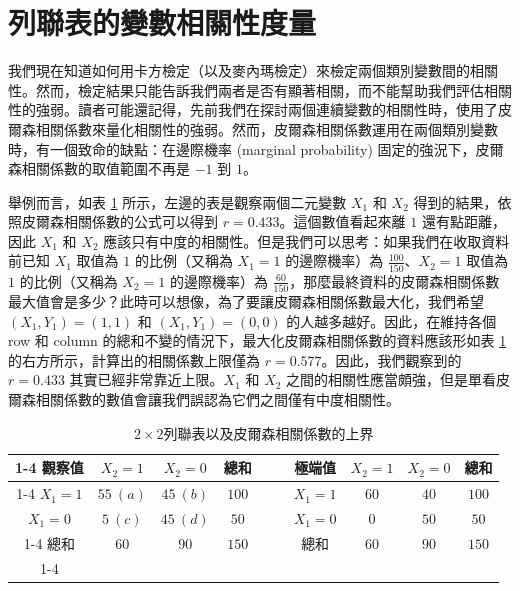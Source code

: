 \section{列聯表的變數相關性度量}
    我們現在知道如何用卡方檢定（以及麥內瑪檢定）來檢定兩個類別變數間的相關性。然而，檢定結果只能告訴我們兩者是否有顯著相關，而不能幫助我們評估相關性的強弱。讀者可能還記得，先前我們在探討兩個連續變數的相關性時，使用了皮爾森相關係數來量化相關性的強弱。然而，皮爾森相關係數運用在兩個類別變數時，有一個致命的缺點：在邊際機率 (marginal probability) 固定的強況下，皮爾森相關係數的取值範圍不再是 $-1$ 到 $1$。

    \medskip
    
    舉例而言，如表 \ref{tab:odds_ratio} 所示，左邊的表是觀察兩個二元變數 $X_1$ 和 $X_2$ 得到的結果，依照皮爾森相關係數的公式可以得到 $r=0.433$。這個數值看起來離 $1$ 還有點距離，因此 $X_1$ 和 $X_2$ 應該只有中度的相關性。但是我們可以思考：如果我們在收取資料前已知 $X_1$ 取值為 $1$ 的比例（又稱為 $X_1=1$ 的邊際機率）為 $\frac{100}{150}$、$X_2 = 1$ 取值為 $1$ 的比例（又稱為 $X_2=1$ 的邊際機率）為 $\frac{60}{150}$，那麼最終資料的皮爾森相關係數最大值會是多少？此時可以想像，為了要讓皮爾森相關係數最大化，我們希望 $(X_1, Y_1) = (1,1)$ 和 $(X_1, Y_1) = (0,0)$ 的人越多越好。因此，在維持各個 row 和 column 的總和不變的情況下，最大化皮爾森相關係數的資料應該形如表 \ref{tab:odds_ratio} 的右方所示，計算出的相關係數上限僅為 $r=0.577$。因此，我們觀察到的 $r=0.433$ 其實已經非常靠近上限。$X_1$ 和 $X_2$ 之間的相關性應當頗強，但是單看皮爾森相關係數的數值會讓我們誤認為它們之間僅有中度相關性。

    \bigskip

    \begin{table}[htbp]
        \begin{center}
            \begin{tabular}{c|cc|cccc|cc|c}
                \cline{1-4}\cline{7-10}
                觀察值 & $X_2=1$ & $X_2=0$ & 總和 &&& 極端值 & $X_2=1$ & $X_2=0$ & 總和\\
                \cline{1-4}\cline{7-10}
                $X_1=1$ & $55~(a)$ & $45~(b)$ & $100$ &&& $X_1=1$ & $60$ & $40$ & $100$\\
                $X_1=0$ & $5~(c)$ & $45~(d)$ & $50$ &&& $X_1=0$ & $0$ & $50$ & $50$\\
                \cline{1-4}\cline{7-10}
                總和 & $60$ & $90$ & $150$ &&& 總和 & $60$ & $90$ & $150$\\
                \cline{1-4}\cline{7-10}
            \end{tabular}
            \caption{$2 \times 2$列聯表以及皮爾森相關係數的上界\label{tab:odds_ratio}}
        \end{center}
    \end{table}

